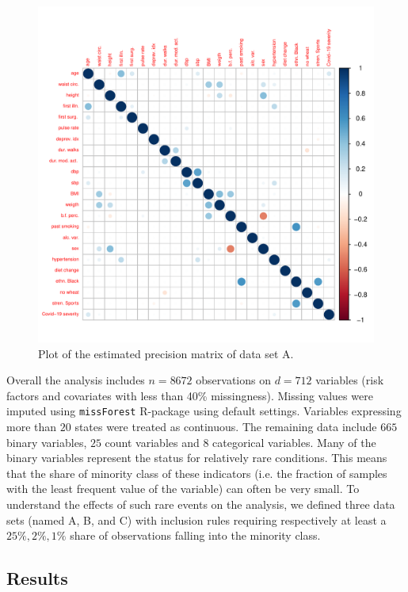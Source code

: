 \begin{figure}[ht]
    \centering
    \includegraphics[scale=.6]{Figures/corrplot_omega_A.pdf}
    \caption{Plot of the estimated precision matrix of data set A.}
    \label{fig:corrplot_omega_A}
\end{figure}
Overall the analysis includes $n=8672$ observations on $d=712$ variables (risk factors and covariates with less than 40\% missingness). Missing values were imputed using \texttt{missForest} R-package using  default settings. Variables expressing more than $20$ states were treated as continuous. The remaining data include $665$ binary variables, $25$ count variables and $8$ categorical variables. Many of the binary variables represent the status for relatively rare conditions. This means that the share of minority class of these indicators 
(i.e. the fraction of samples with the least frequent value of the variable)
can often be very small. 
To understand the effects of such rare events on the analysis, we defined 
 three data sets (named A, B, and C) with inclusion rules requiring respectively at least a $25\%, 2\%, 1\%$ share of observations falling into the minority class.

\subsection{Results}
 
